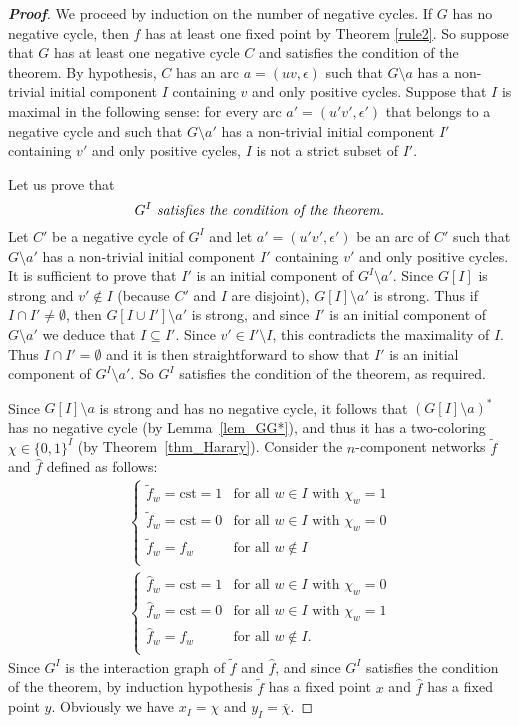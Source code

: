 \documentclass[11pt,a4paper]{article}
\def\cst{\mathrm{cst}}
\def\B{\{0,1\}}
\begin{document}
\begin{proof}[{\bf Proof}]
We proceed by induction on the number of negative cycles. If $G$ has no negative cycle, then $f$ has at least one fixed point by Theorem \ref{rule2}. So suppose that $G$ has at least one negative cycle $C$ and satisfies the condition of the theorem. By hypothesis, $C$ has an arc $a=(uv,\epsilon)$ such that $G\setminus a$ has a non-trivial initial component $I$ containing $v$ and only positive cycles. Suppose that $I$ is maximal in the following sense: for every arc $a'=(u'v',\epsilon')$ that belongs to a negative cycle and such that $G\setminus a'$ has a non-trivial initial component $I'$ containing $v'$ and only positive cycles, $I$ is not a strict subset of $I'$. 

\medskip
Let us prove that \[
\text{\em $G^I$ satisfies the condition of the theorem.}
\]
Let $C'$ be a negative cycle of $G^I$ and let $a'=(u'v',\epsilon')$ be an arc of $C'$ such that $G\setminus a'$ has a non-trivial initial component $I'$ containing $v'$ and only positive cycles. It is sufficient to prove that $I'$ is an initial component of $G^I\setminus a'$. Since $G[I]$ is strong and $v'\not\in I$ (because $C'$ and $I$ are disjoint), $G[I]\setminus a'$ is strong. Thus if $I\cap I'\neq\emptyset$, then $G[I\cup I']\setminus a'$ is strong, and since $I'$ is an initial component of $G\setminus a'$ we deduce that $I\subseteq I'$. Since $v'\in I'\setminus I$, this contradicts the maximality of $I$. Thus $I\cap I'=\emptyset$ and it is then straightforward to show that $I'$ is an initial component of $G^I\setminus a'$. So $G^I$ satisfies the condition of the theorem, as required. 

\medskip
Since $G[I]\setminus a$ is strong and has no negative cycle, it follows that $(G[I]\setminus a)^*$ has no negative cycle (by Lemma~\ref{lem_GG*}), and thus it has a two-coloring $\chi\in \B^I$ (by Theorem~\ref{thm_Harary}). Consider the $n$-component networks $\tilde f$ and $\hat f$ defined as follows: 
\[
\begin{array}{c}
\left\{
\begin{array}{ll}
\tilde f_w=\cst=1&\text{for all }w\in I\text{ with }\chi_w=1\\
\tilde f_w=\cst=0&\text{for all }w\in I\text{ with }\chi_w=0\\
\tilde f_w=f_w&\text{for all }w\notin I\\
\end{array}
\right.
\\[8mm]
\left\{
\begin{array}{ll}
\hat f_w=\cst=1&\text{for all }w\in I\text{ with }\chi_w=0\\
\hat f_w=\cst=0&\text{for all }w\in I\text{ with }\chi_w=1\\
\hat f_w=f_w&\text{for all }w\notin I.\\
\end{array}
\right.
\end{array}
\]
Since $G^I$ is the interaction graph of $\tilde f$ and $\hat f$, and since $G^I$ satisfies the condition of the theorem, by induction hypothesis $\tilde f$ has a fixed point $x$ and $\hat f$ has a fixed point $y$. Obviously we have $x_I=\chi$ and $y_I=\overline{\chi}$.  


\end{proof}
\end{document}
